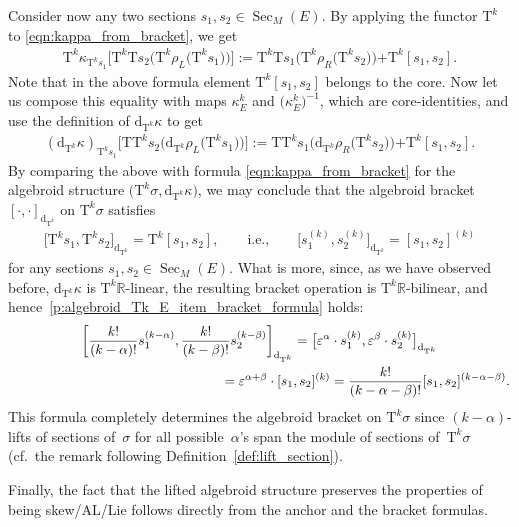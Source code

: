 \documentclass[pdftex]{sigma}
\newcommand{\R}{\mathbb{R}}
\newcommand{\Sec}{\operatorname{Sec}}
\newcommand{\dd}{\mathrm{d}}
\newcommand{\eps}{\varepsilon}
\newcommand{\plus}{\boldsymbol{\pmb{+}}}
\newcommand{\rhoL}{\rho_L} %
\newcommand{\rhoR}{\rho_R}
\newcommand{\T}{\mathrm{T}} %
\newcommand{\TT}[1]{\mathrm{T}^{#1}} %
\numberwithin{equation}{section}
\theoremstyle{definition}
\begin{document}
 Consider now any two sections $s_1,s_2\in\Sec_M(E)$. By applying the functor $\TT{k}$ to \eqref{eqn:kappa_from_bracket}, we get
\begin{gather*}\TT{k}\kappa_{\TT{k} s_1}\big[\TT{k}\T s_2\big(\TT{k}\rhoL\big(\TT{k} s_1\big)\big)\big]:=\TT{k}\T s_1\big(\TT{k}\rhoR\big(\TT{k}s_2\big)\big)\plus \TT{k}[s_1,s_2].\end{gather*}
Note that in the above formula element $\TT{k}[s_1,s_2]$ belongs to the core. Now let us compose this equality with maps $\kappa^k_E$ and $\big(\kappa^k_E\big)^{-1}$, which are core-identities, and use the definition of $\dd_{\TT{k}}\kappa$ to get
 \begin{gather*}(\dd_{\TT{k}}\kappa)_{\TT{k} s_1}\big[\T\TT{k} s_2\big(\dd_{\TT{k}}\rhoL\big(\TT{k} s_1\big)\big)\big]:=\T\TT{k} s_1\big(\dd_{\TT{k}}\rhoR\big(\TT{k}s_2\big)\big)\plus \TT{k}[s_1,s_2].\end{gather*}
By comparing the above with formula \eqref{eqn:kappa_from_bracket} for the algebroid structure $\big(\TT{k}\sigma, \dd_{\TT{k}}\kappa\big)$, we may conclude that the algebroid bracket $[\cdot,\cdot]_{\dd_{\TT{k}}}$ on $\TT{k}\sigma$ satisfies
\begin{gather*}\big[\TT{k}s_1,\TT{k} s_2\big]_{\dd_{\TT{k}}}=\TT{k}[s_1,s_2],\qquad \text{i.e.,}\qquad \big[s_1^{(k)},s_2^{(k)}\big]_{\dd_{\TT{k}}}=[s_1,s_2]^{(k)}\end{gather*}
for any sections $s_1,s_2\in\Sec_M(E)$. What is more, since, as we have observed before, $\dd_{\TT{k}}\kappa$ is $\TT{k}\R$-linear, the resulting bracket operation is $\TT{k}\R$-bilinear, and hence~\eqref{p:algebroid_Tk_E_item_bracket_formula} holds:
\begin{gather*}
\left[ \frac{k!}{(k-\alpha)!}s_1^{(k-\alpha)}, \frac{k!}{(k-\beta)!}s_2^{(k-\beta)}\right]_{\dd_{\TT{k}}}= \big[\eps^\alpha\cdot s_1^{(k)},\eps^\beta\cdot s_2^{(k)}\big]_{\dd_{\TT{k}}}\\
\hphantom{\left[ \frac{k!}{(k-\alpha)!}s_1^{(k-\alpha)}, \frac{k!}{(k-\beta)!}s_2^{(k-\beta)}\right]_{\dd_{\TT{k}}}}{} =\eps^{\alpha+\beta}\cdot[s_1,s_2]^{(k)}= \frac{k!}{(k-\alpha-\beta)!} [s_1,s_2]^{(k-\alpha-\beta)}.
\end{gather*}
This formula completely determines the algebroid bracket on $\TT{k}\sigma$ since $(k-\alpha)$-lifts of sections of~$\sigma$ for all possible~$\alpha$'s span the module of sections of~$\TT{k}\sigma$ (cf.\ the remark following Definition~\ref{def:lift_section}).

Finally, the fact that the lifted algebroid structure preserves the properties of being \linebreak skew/AL/Lie follows directly from the anchor and the bracket formulas. %
\end{document}
